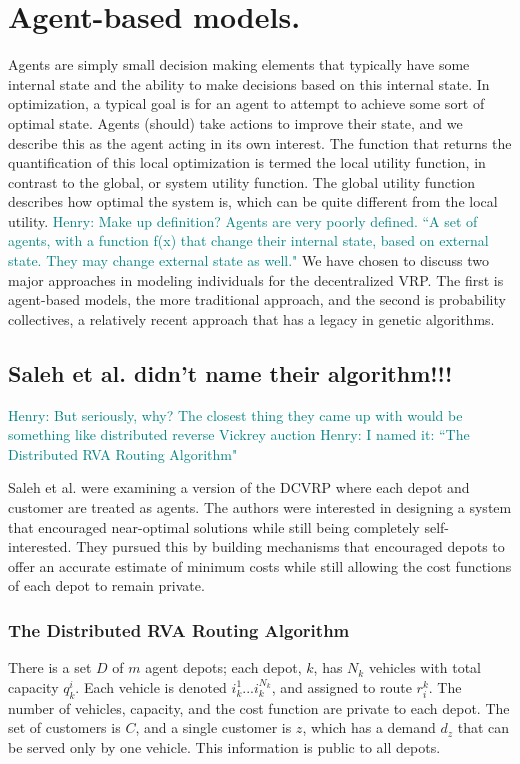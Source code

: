 \documentclass{sig-alternate}
\newcommand{\allcomments}[1]{{#1}}
\newcommand{\hfcomment}[1]{\textcolor{Teal}{\allcomments{Henry: {#1}}}}
\begin{document}
\section{Agent-based models.}
\label{sec:not this section.}
Agents are simply small decision making elements that typically have some internal state and the ability to make decisions based on this internal state. In optimization, a typical goal is for an agent to attempt to achieve some sort of optimal state. Agents (should) take actions to improve their state, and we describe this as the agent acting in its own interest. The function that returns the quantification of this local optimization is termed the local utility function, in contrast to the global, or system utility function. The global utility function describes how optimal the system is, which can be quite different from the local utility. 
\hfcomment{Make up definition? Agents are very poorly defined. ``A set of agents, with a function f(x) that change their internal state, based on external state. They may change external state as well."}
We have chosen to discuss two major approaches in modeling individuals for the decentralized VRP. The first is agent-based models, the more traditional approach, and the second is probability collectives, a relatively recent approach that has a legacy in genetic algorithms.


\subsection{Saleh et al. didn't name their algorithm!!!}
\label{ssec:Saleh}
\hfcomment{But seriously, why? The closest thing they came up with would be something like distributed reverse Vickrey auction}
\hfcomment{I named it: ``The Distributed RVA Routing Algorithm"}

Saleh et al.\cite{Saleh:2012} were examining a version of the DCVRP where each depot and customer are treated as agents. The authors were interested in designing a system that encouraged near-optimal solutions while still being completely self-interested. They pursued this by building mechanisms that encouraged depots to offer an accurate estimate of minimum costs while still allowing the cost functions of each depot to remain private.

\subsubsection{The Distributed RVA Routing Algorithm}
There is a set $D$ of $m$ agent depots; each depot, $k$, has $N_k$ vehicles with total capacity $q_k^i$. Each vehicle is denoted $i_k^1 ... i_k^{N_k}$, and assigned to route $r_i^k$. The number of vehicles, capacity, and the cost function are private to each depot. The set of customers is $C$, and a single customer is $z$, which has a demand $d_z$ that can be served only by one vehicle. This information is public to all depots.
\end{document}

